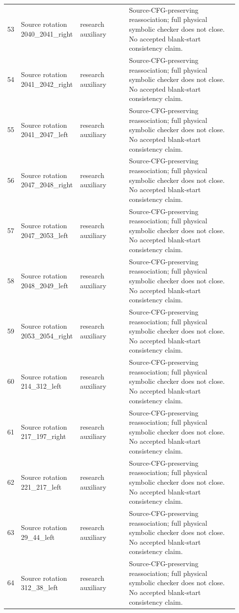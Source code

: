 \begin{longtable}{p{0.035\linewidth}p{0.23\linewidth}p{0.21\linewidth}p{0.47\linewidth}}
53 & Source rotation 2040\_2041\_right & research auxiliary & Source-CFG-preserving reassociation; full physical symbolic checker does not close. No accepted blank-start consistency claim.\\[4pt]
54 & Source rotation 2041\_2042\_right & research auxiliary & Source-CFG-preserving reassociation; full physical symbolic checker does not close. No accepted blank-start consistency claim.\\[4pt]
55 & Source rotation 2041\_2047\_left & research auxiliary & Source-CFG-preserving reassociation; full physical symbolic checker does not close. No accepted blank-start consistency claim.\\[4pt]
56 & Source rotation 2047\_2048\_right & research auxiliary & Source-CFG-preserving reassociation; full physical symbolic checker does not close. No accepted blank-start consistency claim.\\[4pt]
57 & Source rotation 2047\_2053\_left & research auxiliary & Source-CFG-preserving reassociation; full physical symbolic checker does not close. No accepted blank-start consistency claim.\\[4pt]
58 & Source rotation 2048\_2049\_left & research auxiliary & Source-CFG-preserving reassociation; full physical symbolic checker does not close. No accepted blank-start consistency claim.\\[4pt]
59 & Source rotation 2053\_2054\_right & research auxiliary & Source-CFG-preserving reassociation; full physical symbolic checker does not close. No accepted blank-start consistency claim.\\[4pt]
60 & Source rotation 214\_312\_left & research auxiliary & Source-CFG-preserving reassociation; full physical symbolic checker does not close. No accepted blank-start consistency claim.\\[4pt]
61 & Source rotation 217\_197\_right & research auxiliary & Source-CFG-preserving reassociation; full physical symbolic checker does not close. No accepted blank-start consistency claim.\\[4pt]
62 & Source rotation 221\_217\_left & research auxiliary & Source-CFG-preserving reassociation; full physical symbolic checker does not close. No accepted blank-start consistency claim.\\[4pt]
63 & Source rotation 29\_44\_left & research auxiliary & Source-CFG-preserving reassociation; full physical symbolic checker does not close. No accepted blank-start consistency claim.\\[4pt]
64 & Source rotation 312\_38\_left & research auxiliary & Source-CFG-preserving reassociation; full physical symbolic checker does not close. No accepted blank-start consistency claim.\\[4pt]

\end{longtable}
